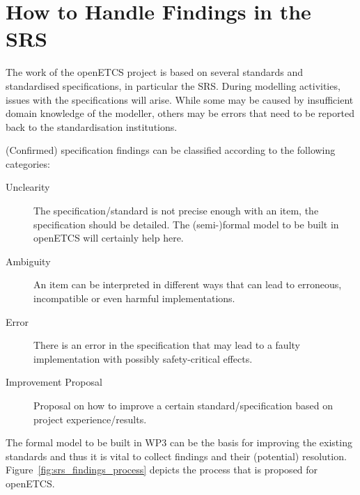 \section{How to Handle Findings in the SRS}

The work of the openETCS project is based on several standards and standardised specifications, in particular the SRS. During modelling activities, issues with the specifications will arise. While some may be caused by insufficient domain knowledge of the modeller, others may be errors that need to be reported back to the standardisation institutions.

(Confirmed) specification findings can be classified according to the following categories:

\begin{description}
  \item[Unclearity] The specification/standard is not precise enough with an item, the specification should be detailed. The (semi-)formal model to be built in openETCS will certainly help here.
  \item[Ambiguity] An item can be interpreted in different ways that can lead to erroneous, incompatible or even harmful implementations.
  \item[Error] There is an error in the specification that may lead to a faulty implementation with possibly safety-critical effects.
  \item[Improvement Proposal] Proposal on how to improve a certain standard/specification based on project experience/results.
\end{description}

The formal model to be built in WP3 can be the basis for improving the existing standards and thus it is vital to collect findings and their (potential) resolution. Figure~\ref{fig:srs_findings_process} depicts the process that is proposed for openETCS.

